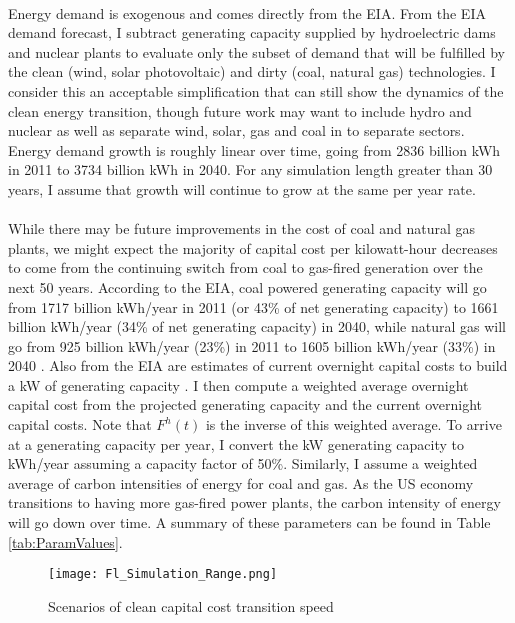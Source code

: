 \documentclass{easychithesis}
\begin{document}
\paragraph{} Energy demand is exogenous and comes directly from the EIA. From the EIA demand forecast, I subtract generating capacity supplied by hydroelectric dams and nuclear plants to evaluate only the subset of demand that will be fulfilled by the clean (wind, solar photovoltaic) and dirty (coal, natural gas) technologies. I consider this an acceptable simplification that can still show the dynamics of the clean energy transition, though future work may want to include hydro and nuclear as well as separate wind, solar, gas and coal in to separate sectors. Energy demand growth is roughly linear over time, going from 2836 billion kWh in 2011 to 3734 billion kWh in 2040. For any simulation length greater than 30 years, I assume that growth will continue to grow at the same per year rate. 

\paragraph{} While there may be future improvements in the cost of coal and natural gas plants, we might expect the majority of capital cost per kilowatt-hour decreases to come from the continuing switch from coal to gas-fired generation over the next 50 years. According to the EIA, coal powered generating capacity will go from 1717 billion kWh/year in 2011 (or 43\% of net generating capacity) to 1661 billion kWh/year (34\% of net generating capacity) in 2040, while natural gas will go from 925 billion kWh/year (23\%) in 2011 to 1605 billion kWh/year (33\%) in 2040 \cite{EIATable5}. Also from the EIA are estimates of current overnight capital costs to build a kW of generating capacity \cite{EIACapCost}. I then compute a weighted average overnight capital cost from the projected generating capacity and the current overnight capital costs. Note that $F^h(t)$ is the inverse of this weighted average. To arrive at a generating capacity per year, I convert the kW generating capacity to kWh/year assuming a capacity factor of 50\%. Similarly, I assume a weighted average of carbon intensities of energy for coal and gas. As the US economy transitions to having more gas-fired power plants, the carbon intensity of energy will go down over time. A summary of these parameters can be found in Table \ref{tab:ParamValues}. 

\begin{figure}[h]\label{fig:FlScaleScenarios}
\texttt{[image: Fl\_Simulation\_Range.png]}
\caption{Scenarios of clean capital cost transition speed}
\end{figure}
\end{document}
